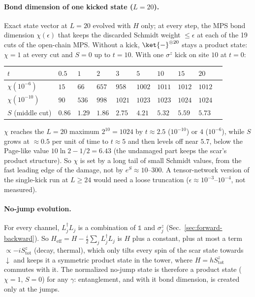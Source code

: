 \paragraph{Bond dimension of one kicked state ($L = 20$).} Exact state vector at $L = 20$ evolved with $H$ only; at every step, the MPS bond dimension $\chi(\epsilon)$ that keeps the discarded Schmidt weight $\le \epsilon$ at each of the 19 cuts of the open-chain MPS. Without a kick, $\ket{-}^{\otimes 20}$ stays a product state: $\chi = 1$ at every cut and $S = 0$ up to $t = 10$. With one $\sigma^z$ kick on site $10$ at $t = 0$:
\begin{center}
\small
\begin{tabular}{llllllllll}
\toprule
$t$ & $0.5$ & $1$ & $2$ & $3$ & $5$ & $10$ & $15$ & $20$ \\
\midrule
$\chi(10^{-6})$ & $15$ & $66$ & $657$ & $958$ & $1002$ & $1011$ & $1012$ & $1012$ \\
$\chi(10^{-10})$ & $90$ & $536$ & $998$ & $1021$ & $1023$ & $1023$ & $1024$ & $1024$ \\
$S$ (middle cut) & $0.86$ & $1.29$ & $1.86$ & $2.75$ & $4.21$ & $5.32$ & $5.59$ & $5.73$ \\
\bottomrule
\end{tabular}
\end{center}
$\chi$ reaches the $L = 20$ maximum $2^{10} = 1024$ by $t \approx 2.5$ ($10^{-10}$) or $4$ ($10^{-6}$), while $S$ grows at $\approx 0.5$ per unit of time to $t \approx 5$ and then levels off near $5.7$, below the Page-like value $10\ln 2 - 1/2 = 6.43$ (the undamaged part keeps the scar's product structure). So $\chi$ is set by a long tail of small Schmidt values, from the fast leading edge of the damage, not by $e^{S} \approx 10$--$300$. A tensor-network version of the single-kick run at $L \ge 24$ would need a loose truncation ($\epsilon \approx 10^{-3}$--$10^{-4}$, not measured).

\paragraph{No-jump evolution.} For every channel, $L_j^\dagger L_j$ is a combination of $\mathds 1$ and $\sigma^z_j$ (Sec.~\ref{sec:forward-backward}). So $H_{\mathrm{eff}} = H - \tfrac i2\sum_j L_j^\dagger L_j$ is $H$ plus a constant, plus at most a term $\propto -iS^z_{\mathrm{tot}}$ (decay, thermal), which only tilts every spin of the scar state towards $\downarrow$ and keeps it a symmetric product state in the tower, where $H = hS^z_{\mathrm{tot}}$ commutes with it. The normalized no-jump state is therefore a product state ($\chi = 1$, $S = 0$) for any $\gamma$: entanglement, and with it bond dimension, is created only at the jumps.

